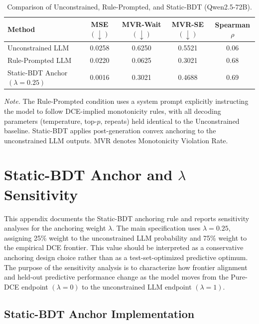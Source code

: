 \documentclass[11pt]{article}
\begin{document}
\begin{table}[h]
\centering
\caption{Comparison of Unconstrained, Rule-Prompted, and Static-BDT (Qwen2.5-72B).}
\label{tab:rule_prompted_comparison}
\small
\begin{tabular}{l c c c c}
\toprule
\textbf{Method} & \textbf{MSE $(\downarrow)$} & \textbf{MVR-Wait $(\downarrow)$} & \textbf{MVR-SE $(\downarrow)$} & \textbf{Spearman $\rho$} \\
\midrule
Unconstrained LLM & 0.0258 & 0.6250 & 0.5521 & $0.06$ \\
Rule-Prompted LLM & 0.0220 & 0.0625 & 0.3021 & 0.68 \\
Static-BDT Anchor $(\lambda=0.25)$ & 0.0016 & 0.3021 & 0.4688 & 0.69 \\
\bottomrule
\end{tabular}
\vspace{0.4em}
\begin{minipage}{0.95\textwidth}
\small
\textit{Note.} The Rule-Prompted condition uses a system prompt explicitly instructing the model to follow DCE-implied monotonicity rules, with all decoding parameters (temperature, top-$p$, repeats) held identical to the Unconstrained baseline. Static-BDT applies post-generation convex anchoring to the unconstrained LLM outputs. MVR denotes Monotonicity Violation Rate.
\end{minipage}
\end{table}

\section{Static-BDT Anchor and \texorpdfstring{\(\lambda\)}{lambda} Sensitivity}
\label{app:lambda}

This appendix documents the Static-BDT anchoring rule and reports sensitivity analyses for the anchoring weight \(\lambda\). The main specification uses \(\lambda=0.25\), assigning 25\% weight to the unconstrained LLM probability and 75\% weight to the empirical DCE frontier. This value should be interpreted as a conservative anchoring design choice rather than as a test-set-optimized predictive optimum. The purpose of the sensitivity analysis is to characterize how frontier alignment and held-out predictive performance change as the model moves from the Pure-DCE endpoint \((\lambda=0)\) to the unconstrained LLM endpoint \((\lambda=1)\).

\subsection{Static-BDT Anchor Implementation}
\end{document}
